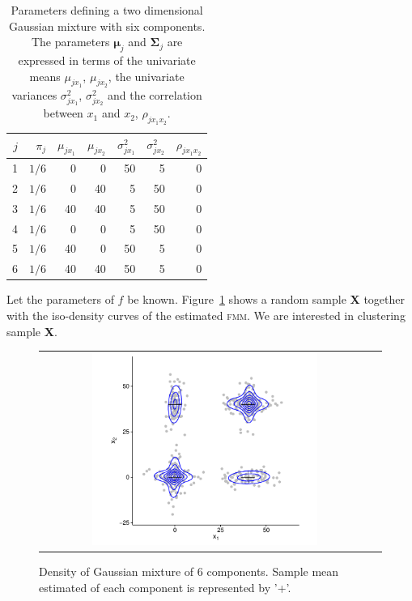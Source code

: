 \documentclass[10pt, a4paper]{article}
\theoremstyle{definition}
\newcommand{\m}[1]{\boldsymbol{#1}}
\newcommand{\fmm}{\textsc{fmm}\xspace}
\begin{document}
\begin{spacing}{1.9}
\begin{table}[t]
\centering
\begin{tabular}{rrrrrrr}
  \hline
$j$ & $\pi_j$ & $\mu_{j x_1}$ & $\mu_{j x_2}$ & $\sigma^2_{j x_1}$ & $\sigma^2_{j x_2}$ & $\rho_{j x_1 x_2}$ \\ 
  \hline
  1 &  $1/6$ &     0 &     0 &    50 &     5 &     0 \\ 
  2 &  $1/6$  &     0 &    40 &     5 &    50 &     0 \\ 
  3 &  $1/6$  &    40 &    40 &     5 &    50 &     0 \\ 
  4 &  $1/6$  &     0 &     0 &     5 &    50 &     0 \\ 
  5 &  $1/6$  &    40 &     0 &    50 &     5 &     0 \\ 
  6 &  $1/6$  &    40 &    40 &    50 &     5 &     0 \\ 
   \hline
\end{tabular}
\caption{Parameters defining a two dimensional Gaussian mixture with six components. The parameters $\m\mu_j$ and $\m\Sigma_j$ are expressed in terms of the univariate means $\mu_{j x_1}$, $\mu_{j x_2}$, the univariate variances $\sigma^2_{j x_1}$, $\sigma^2_{j x_2}$ and the correlation between $x_1$ and $x_2$, $\rho_{j x_1 x_2}$.}
\label{pars_table}
\end{table}


Let the parameters of $f$ be known. Figure~\ref{ex_mixture} shows a random sample \textbf{X} together with the iso-density curves of the estimated \fmm. We are interested in clustering sample \textbf{X}.

\begin{figure}[thbp]
\begin{center}
\begin{tabular}{cc}
  \includegraphics[width=0.7\textwidth]{figures/partition-example-mixture.pdf} \\
 \end{tabular}
 \caption{Density of Gaussian mixture of 6 components. Sample mean estimated of each component is represented by '+'.}\label{ex_mixture}
\end{center}
\end{figure}


\end{spacing}
\end{document}

